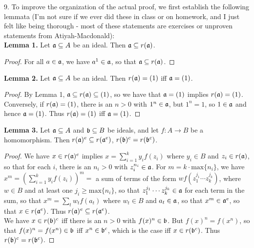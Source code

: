 \documentclass[11pt]{article}
\begin{document}
\num{9.} To improve the organization of the actual proof, we first establish
the following lemmata (I'm not sure if we ever did these in class or on
homework, and I just felt like being thorough - most of these statements
are exercises or unproven statements from Atiyah-Macdonald): \\

{\bf Lemma 1.} Let $\frak{a}\subseteq A$ be an ideal. Then $\frak{a}\subseteq
r(\frak{a})$.
\begin{proof} For all $a\in\frak{a}$, we have $a^1\in\frak{a}$, so that
$\frak{a}\subseteq r(\frak{a})$.
\end{proof}
{\bf Lemma 2.} Let $\frak{a}\subseteq A$ be an ideal. Then $r(\frak{a})=(1)$
iff $\frak{a}=(1)$.
\begin{proof} By Lemma 1, $\frak{a}\subseteq r(\frak{a})\subseteq (1)$,
so we have that $\frak{a}=(1)$ implies $r(\frak{a})=(1)$. Conversely, if
$r(\frak{a})=(1)$, there is an $n>0$ with $1^n\in\frak{a}$, but $1^n=1$,
so $1\in\frak{a}$ and hence $\frak{a}=(1)$. Thus $r(\frak{a})=(1)$ iff
$\frak{a}=(1)$.
\end{proof}
{\bf Lemma 3.} Let $\frak{a}\subseteq A$ and $\frak{b}\subseteq B$ be ideals,
and let $f:A\rightarrow B$ be a homomorphism. Then $r(\frak{a})^e\subseteq
r(\frak{a}^e)$, $r(\frak{b})^c=r(\frak{b}^c)$.
\begin{proof} We have $x\in r(\frak{a})^e$ implies $x=\sum_{i=1}^k y_if(z_i)$
where $y_i\in B$ and $z_i\in r(\frak{a})$, so that for each $i$, there is
an $n_i>0$ with $z_i^{n_i}\in\frak{a}$. For $m=k\cdot\text{max}\{n_i\}$,
we have $x^m=\left(\sum_{i=1}^k y_if(z_i)\right)^m = $ a sum of terms of
the form $wf(z_1^{j_1}\cdots z_k^{j_k})$, where $w\in B$ and at least one
$j_i\geq\text{max}\{n_i\}$, so that $z_1^{j_1}\cdots z_k^{j_k}\in\frak{a}$
for each term in the sum, so that $x^m=\sum_t w_t f(a_t)$ where $w_t\in
B$ and $a_t\in \frak{a}$, so that $x^m\in\frak{a}^e$, so that $x\in
r(\frak{a}^e)$. Thus $r(\frak{a})^e\subseteq r(\frak{a}^e)$.\\

We have $x\in r(\frak{b})^c$ iff there is an $n>0$ with
$f(x)^n\in\frak{b}$. But $f(x)^n=f(x^n)$, so that $f(x)^n=f(x^n)\in\frak{b}$
iff $x^n\in\frak{b}^c$, which is the case iff $x\in r(\frak{b}^c)$. Thus
$r(\frak{b})^c=r(\frak{b}^c)$. 
\end{proof}
\end{document}
